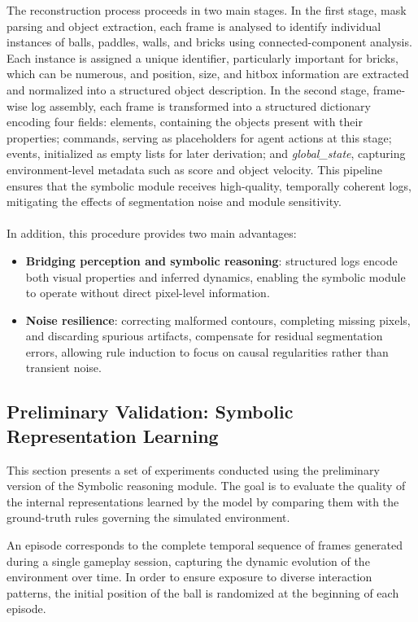 \documentclass[12pt,a4paper]{report}
\begin{document}
The reconstruction process proceeds in two main stages.
In the first stage, mask parsing and object extraction, each frame is analysed to identify individual instances of balls, paddles, walls, and bricks using connected-component analysis. Each instance is assigned a unique identifier, particularly important for bricks, which can be numerous, and position, size, and hitbox information are extracted and normalized into a structured object description. In the second stage, frame-wise log assembly, each frame is transformed into a structured dictionary encoding four fields: elements, containing the objects present with their properties; commands, serving as placeholders for agent actions at this stage; events, initialized as empty lists for later derivation; and \textit{global\_state}, capturing environment-level metadata such as score and object velocity.
This pipeline ensures that the symbolic module receives high-quality, temporally coherent logs, mitigating the effects of segmentation noise and module sensitivity.
\\
\\
In addition, this procedure provides two main advantages:
\begin{itemize}
    \item \textbf{Bridging perception and symbolic reasoning}: structured logs encode both visual properties and inferred dynamics, enabling the symbolic module to operate without direct pixel-level information.
    \item \textbf{Noise resilience}: correcting malformed contours, completing missing pixels, and discarding spurious artifacts, compensate for residual segmentation errors, allowing rule induction to focus on causal regularities rather than transient noise.
\end{itemize}    

\subsection{Preliminary Validation: Symbolic Representation Learning}
This section presents a set of experiments conducted using the preliminary version of the Symbolic reasoning module. The goal is to evaluate the quality of the internal representations learned by the model by comparing them with the ground-truth rules governing the simulated environment.

An episode corresponds to the complete temporal sequence of frames generated during a single gameplay session, capturing the dynamic evolution of the environment over time. In order to ensure exposure to diverse interaction patterns, the initial position of the ball is randomized at the beginning of each episode.
\end{document}
